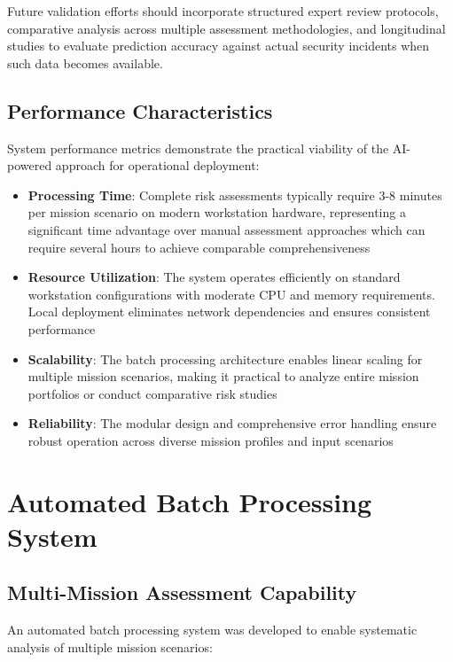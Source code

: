 \documentclass[binding=0.6cm]{sapthesis}
\begin{document}
Future validation efforts should incorporate structured expert review protocols, comparative analysis across multiple assessment methodologies, and longitudinal studies to evaluate prediction accuracy against actual security incidents when such data becomes available.

\subsection{Performance Characteristics}

System performance metrics demonstrate the practical viability of the AI-powered approach for operational deployment:

\begin{itemize}
    \item \textbf{Processing Time}: Complete risk assessments typically require 3-8 minutes per mission scenario on modern workstation hardware, representing a significant time advantage over manual assessment approaches which can require several hours to achieve comparable comprehensiveness
    \item \textbf{Resource Utilization}: The system operates efficiently on standard workstation configurations with moderate CPU and memory requirements. Local deployment eliminates network dependencies and ensures consistent performance
    \item \textbf{Scalability}: The batch processing architecture enables linear scaling for multiple mission scenarios, making it practical to analyze entire mission portfolios or conduct comparative risk studies
    \item \textbf{Reliability}: The modular design and comprehensive error handling ensure robust operation across diverse mission profiles and input scenarios
\end{itemize}

\section{Automated Batch Processing System}

\subsection{Multi-Mission Assessment Capability}

An automated batch processing system was developed to enable systematic analysis of multiple mission scenarios:
\end{document}
